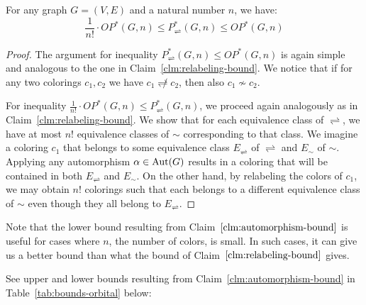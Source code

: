 \begin{claim}\label{clm:automorphism-bound}
    For any graph $G=(V,E)$ and a natural number $n$, we have: $$\frac{1}{n!} \cdot OP^*(G,n) \leq P^*_\rightleftharpoons(G,n) \leq OP^*(G,n)$$
\end{claim}

\begin{proof}

The argument for inequality $P^*_\rightleftharpoons(G,n) \leq OP^*(G,n)$ is again simple and analogous to the one in Claim~\ref{clm:relabeling-bound}. We notice that if for any two colorings $c_1,c_2$ we have $c_1 \not\rightleftharpoons c_2$, then also $c_1 \not\sim c_2$.

For inequality $\frac{1}{n!} \cdot OP^*(G,n) \leq P^*_\rightleftharpoons(G,n)$, we proceed again analogously as in Claim~\ref{clm:relabeling-bound}. We show that for each equivalence class of $\rightleftharpoons$, we have at most $n!$ equivalence classes of $\sim$ corresponding to that class. We imagine a coloring $c_1$ that belongs to some equivalence class $E_\rightleftharpoons$ of $\rightleftharpoons$ and $E_\sim$ of $\sim$. Applying any automorphism $\alpha \in \operatorname{Aut}(G)$ results in a coloring that will be contained in both $E_\rightleftharpoons$ and $E_\sim$. On the other hand, by relabeling the colors of $c_1$, we may obtain $n!$ colorings such that each belongs to a different equivalence class of $\sim$ even though they all belong to $E_\rightleftharpoons$.

\end{proof}

Note that the lower bound resulting from Claim~$\ref{clm:automorphism-bound}$ is useful for cases where $n$, the number of colors, is small. In such cases, it can give us a better bound than what the bound of Claim~$\ref{clm:relabeling-bound}$ gives.

See upper and lower bounds resulting from Claim~\ref{clm:automorphism-bound} in Table~\ref{tab:bounds-orbital} below:

